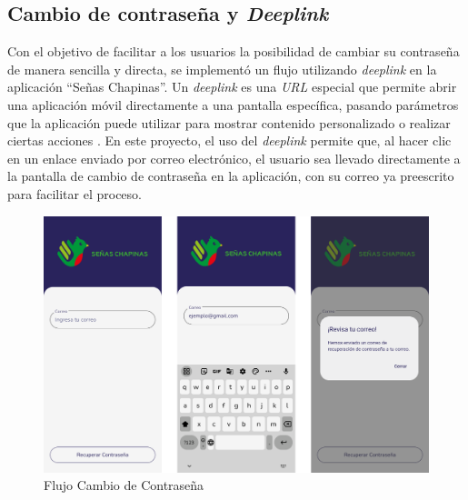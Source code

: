 
\subsection{Cambio de contraseña y \textit{Deeplink}}

Con el objetivo de facilitar a los usuarios la posibilidad de cambiar su contraseña de manera sencilla y directa, se implementó un flujo utilizando \textit{deeplink} en la aplicación ``Señas Chapinas''. Un \textit{deeplink }es una \textit{URL} especial que permite abrir una aplicación móvil directamente a una pantalla específica, pasando parámetros que la aplicación puede utilizar para mostrar contenido personalizado o realizar ciertas acciones \cite{meijomil2024}. En este proyecto, el uso del \textit{deeplink} permite que, al hacer clic en un enlace enviado por correo electrónico, el usuario sea llevado directamente a la pantalla de cambio de contraseña en la aplicación, con su correo ya preescrito para facilitar el proceso.

\begin{figure} [H]
    \centering
    \includegraphics[width=0.5\linewidth]{figuras/cambio_contra_flujo.png}
    \caption{Flujo Cambio de Contraseña}
    \label{fig:enter-label}
\end{figure}


